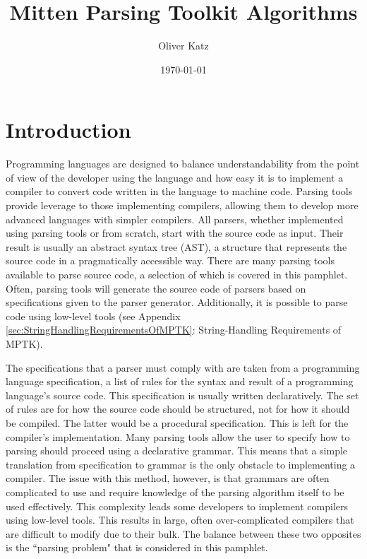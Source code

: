 \documentclass[10pt,a4paper]{article}
\title{Mitten Parsing Toolkit Algorithms}
\author{Oliver Katz}
\date{\today}
\begin{document}
\maketitle

\tableofcontents

\section{Introduction}

Programming languages are designed to balance understandability from the point of view of the developer using the language and how easy it is to implement a compiler to convert code written in the language to machine code. Parsing tools provide leverage to those implementing compilers, allowing them to develop more advanced languages with simpler compilers.  All parsers, whether implemented using parsing tools or from scratch, start with the source code as input. Their result is usually an abstract syntax tree (AST), a structure that represents the source code in a pragmatically accessible way.  There are many parsing tools available to parse source code, a selection of which is covered in this pamphlet. Often, parsing tools will generate the source code of parsers based on specifications given to the parser generator. Additionally, it is possible to parse code using low-level tools (see Appendix \ref{sec:StringHandlingRequirementsOfMPTK}: String-Handling Requirements of MPTK).

The specifications that a parser must comply with are taken from a programming language specification, a list of rules for the syntax and result of a programming language's source code. This specification is usually written declaratively. The set of rules are for how the source code should be structured, not for how it should be compiled. The latter would be a procedural specification. This is left for the compiler's implementation. Many parsing tools allow the user to specify how to parsing should proceed using a declarative grammar. This means that a simple translation from specification to grammar is the only obstacle to implementing a compiler. The issue with this method, however, is that grammars are often complicated to use and require knowledge of the parsing algorithm itself to be used effectively. This complexity leads some developers to implement compilers using low-level tools. This results in large, often over-complicated compilers that are difficult to modify due to their bulk. The balance between these two opposites is the ``parsing problem" that is considered in this pamphlet.
\end{document}
